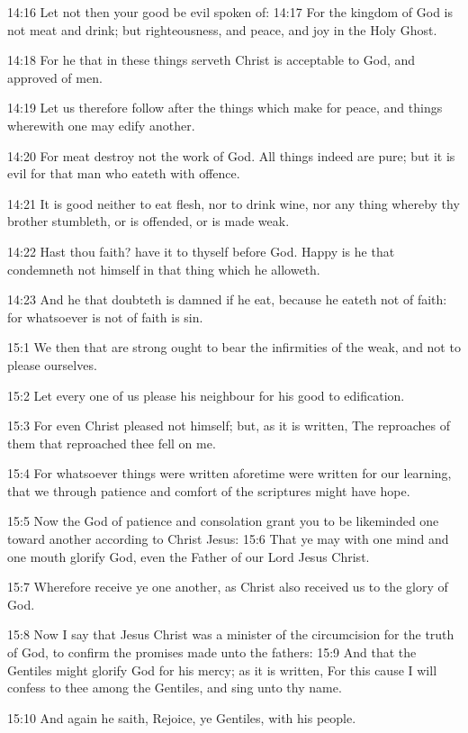 14:16 Let not then your good be evil spoken of: 14:17 For the kingdom of God is not meat and drink; but righteousness, and peace, and joy in the Holy Ghost.

14:18 For he that in these things serveth Christ is acceptable to God, and approved of men.

14:19 Let us therefore follow after the things which make for peace, and things wherewith one may edify another.

14:20 For meat destroy not the work of God. All things indeed are pure; but it is evil for that man who eateth with offence.

14:21 It is good neither to eat flesh, nor to drink wine, nor any thing whereby thy brother stumbleth, or is offended, or is made weak.

14:22 Hast thou faith? have it to thyself before God. Happy is he that condemneth not himself in that thing which he alloweth.

14:23 And he that doubteth is damned if he eat, because he eateth not of faith: for whatsoever is not of faith is sin.

15:1 We then that are strong ought to bear the infirmities of the weak, and not to please ourselves.

15:2 Let every one of us please his neighbour for his good to edification.

15:3 For even Christ pleased not himself; but, as it is written, The reproaches of them that reproached thee fell on me.

15:4 For whatsoever things were written aforetime were written for our learning, that we through patience and comfort of the scriptures might have hope.

15:5 Now the God of patience and consolation grant you to be likeminded one toward another according to Christ Jesus: 15:6 That ye may with one mind and one mouth glorify God, even the Father of our Lord Jesus Christ.

15:7 Wherefore receive ye one another, as Christ also received us to the glory of God.

15:8 Now I say that Jesus Christ was a minister of the circumcision for the truth of God, to confirm the promises made unto the fathers: 15:9 And that the Gentiles might glorify God for his mercy; as it is written, For this cause I will confess to thee among the Gentiles, and sing unto thy name.

15:10 And again he saith, Rejoice, ye Gentiles, with his people.


